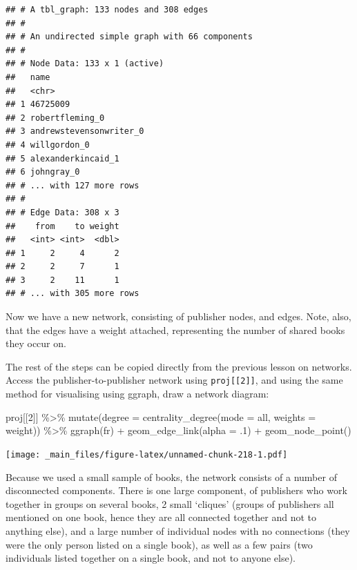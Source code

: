 \documentclass[
]{book}
\newenvironment{Shaded}{\begin{snugshade}}{\end{snugshade}}
\newcommand{\AttributeTok}[1]{\textcolor[rgb]{0.77,0.63,0.00}{#1}}
\newcommand{\DecValTok}[1]{\textcolor[rgb]{0.00,0.00,0.81}{#1}}
\newcommand{\FunctionTok}[1]{\textcolor[rgb]{0.00,0.00,0.00}{#1}}
\newcommand{\NormalTok}[1]{#1}
\newcommand{\SpecialCharTok}[1]{\textcolor[rgb]{0.00,0.00,0.00}{#1}}
\newcommand{\StringTok}[1]{\textcolor[rgb]{0.31,0.60,0.02}{#1}}
\begin{document}
\begin{verbatim}
## # A tbl_graph: 133 nodes and 308 edges
## #
## # An undirected simple graph with 66 components
## #
## # Node Data: 133 x 1 (active)
##   name                   
##   <chr>                  
## 1 46725009               
## 2 robertfleming_0        
## 3 andrewstevensonwriter_0
## 4 willgordon_0           
## 5 alexanderkincaid_1     
## 6 johngray_0             
## # ... with 127 more rows
## #
## # Edge Data: 308 x 3
##    from    to weight
##   <int> <int>  <dbl>
## 1     2     4      2
## 2     2     7      1
## 3     2    11      1
## # ... with 305 more rows
\end{verbatim}

Now we have a new network, consisting of publisher nodes, and edges. Note, also, that the edges have a weight attached, representing the number of shared books they occur on.

The rest of the steps can be copied directly from the previous lesson on networks. Access the publisher-to-publisher network using \texttt{proj{[}{[}2{]}{]}}, and using the same method for visualising using ggraph, draw a network diagram:

\begin{Shaded}
\begin{Highlighting}[]
\NormalTok{proj[[}\DecValTok{2}\NormalTok{]] }\SpecialCharTok{\%\textgreater{}\%} 
  \FunctionTok{mutate}\NormalTok{(}\AttributeTok{degree =} \FunctionTok{centrality\_degree}\NormalTok{(}\AttributeTok{mode =} \StringTok{\textquotesingle{}all\textquotesingle{}}\NormalTok{, }\AttributeTok{weights =}\NormalTok{ weight)) }\SpecialCharTok{\%\textgreater{}\%} 
  \FunctionTok{ggraph}\NormalTok{(}\StringTok{\textquotesingle{}fr\textquotesingle{}}\NormalTok{) }\SpecialCharTok{+} 
  \FunctionTok{geom\_edge\_link}\NormalTok{(}\AttributeTok{alpha =}\NormalTok{ .}\DecValTok{1}\NormalTok{) }\SpecialCharTok{+} 
  \FunctionTok{geom\_node\_point}\NormalTok{()}
\end{Highlighting}
\end{Shaded}

\texttt{[image: \_main\_files/figure-latex/unnamed-chunk-218-1.pdf]}

Because we used a small sample of books, the network consists of a number of disconnected components. There is one large component, of publishers who work together in groups on several books, 2 small `cliques' (groups of publishers all mentioned on one book, hence they are all connected together and not to anything else), and a large number of individual nodes with no connections (they were the only person listed on a single book), as well as a few pairs (two individuals listed together on a single book, and not to anyone else).
\end{document}
